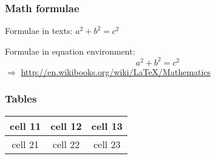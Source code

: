 % 

\begin{frame}
\frametitle{Math formulae}
Formulae in texts: $a^2 + b^2 = c^2$

\noindent Formulae in equation environment:
\begin{equation}
a^2 + b^2 = c^2
\end{equation}
$\Rightarrow$ \url{http://en.wikibooks.org/wiki/LaTeX/Mathematics}
\end{frame}

\begin{frame}
\frametitle{Tables}
\begin{tabular}{c|c|c}
\hline
cell 11 & cell 12 & cell 13 \\
\hline
cell 21 & cell 22 & cell 23 \\
\hline
\end{tabular}
\end{frame}
